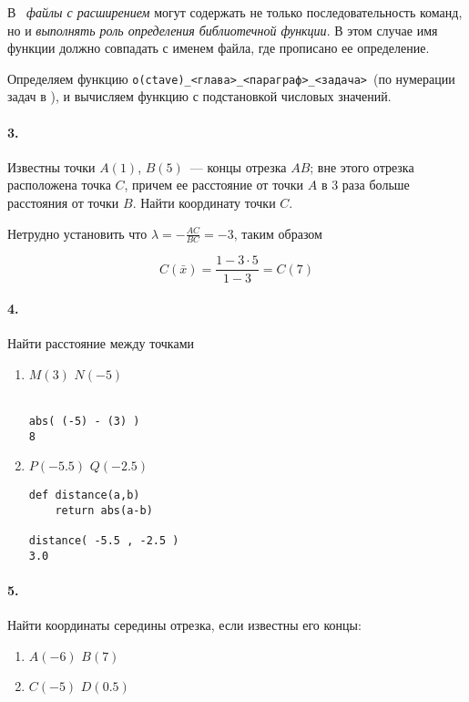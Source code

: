 В \octave\ \emph{файлы с расширением } могут содержать не только
последовательность команд, но и \emph{выполнять роль определения библиотечной
функции}. В этом случае имя функции должно совпадать с именем файла, где
прописано ее определение.



Определяем функцию \verb|o(ctave)_<глава>_<параграф>_<задача>|\ (по нумерации
задач в \cite{danko}), и вычисляем функцию с подстановкой числовых значений.


\paragraph{3.} Известны точки $A(1)$, $B(5)$\ --- концы отрезка $AB$; вне этого
отрезка расположена точка $C$, причем ее расстояние от точки $A$ в 3 раза больше
расстояния от точки $B$. Найти координату точки $C$.

Нетрудно установить что $\lambda = -\frac{AC}{BC} = -3$, таким образом

\begin{equation}
C(\bar x) = \frac{1-3 \cdot 5}{1-3} = C(7) 
\end{equation}


\paragraph{4.} Найти расстояние между точками

\begin{enumerate}
  \item $M(3)$ $N(-5)$
   
  \py\\\verb|abs( (-5) - (3) )|\\\verb|8|
  \item $P(-5.5)$ $Q(-2.5)$
  
  \py
  \begin{verbatim}
def distance(a,b)
    return abs(a-b)

distance( -5.5 , -2.5 )
3.0
\end{verbatim}
\end{enumerate}

\paragraph{5.} Найти координаты середины отрезка, если известны его
концы:
\begin{enumerate}
  \item $A(-6)$ $B(7)$
  \item $C(-5)$ $D(0.5)$
\end{enumerate}

